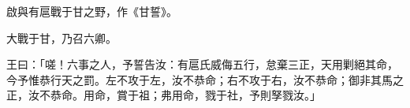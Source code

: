 
\begin{pinyinscope}
啟與有扈戰于甘之野，作《甘誓》。

大戰于甘，乃召六卿。

王曰：「嗟！六事之人，予誓告汝：有扈氏威侮五行，怠棄三正，天用剿絕其命，今予惟恭行天之罰。左不攻于左，汝不恭命；右不攻于右，汝不恭命；御非其馬之正，汝不恭命。用命，賞于祖；弗用命，戮于社，予則孥戮汝。」


\end{pinyinscope}